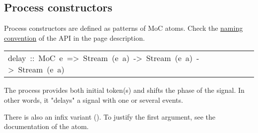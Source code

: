 \subsection{Process constructors}
Process constructors are defined as patterns of MoC
 atoms. Check the \hyperref[naming_conv]{naming convention} of the API in
 the page description.\par

\begin{haddockdesc}
\item[\begin{tabular}{@{}l}
delay\ ::\ MoC\ e\ =>\ Stream\ (e\ a)\ ->\ Stream\ (e\ a)\ ->\ Stream\ (e\ a)
\end{tabular}]\haddockbegindoc
{}
   \par
The  process provides both initial token(s) and shifts the
 phase of the signal. In other words, it "delays" a signal with
 one or several events.\par
There is also an infix variant  (). To justify the
 first argument, see the documentation of the \haddockid{-<-} atom.\par



\end{haddockdesc}

